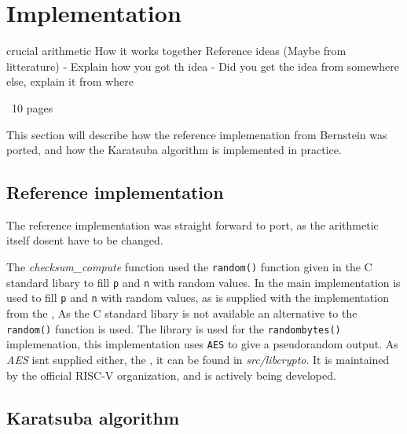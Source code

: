 \section{Implementation}
    crucial arithmetic
    How it works together
    Reference ideas (Maybe from litterature)
    - Explain how you got th idea
    - Did you get the idea from somewhere else, explain it from where

~10 pages

This section will describe how the reference implemenation from Bernstein was ported, and how the Karatsuba algorithm is implemented in practice.
\subsection{Reference implementation}
The reference implementation was straight forward to port, as the arithmetic itself dosent have to be changed.


The \textit{checksum_compute} function used the \texttt{random()} function given in the C standard libary to fill \texttt{p} and \texttt{n} with random values. In the main implementation  is used to fill \texttt{p} and \texttt{n} with random values, as  is supplied with the implementation from the \cite[rainbowgit implemenation]{rainbowgit}, 
As the C standard libary is not available an alternative to the \texttt{random()} function is used. The library \cite[rainbowgit]{rainbowgit} is used for the \texttt{randombytes()} implemenation, this implementation uses \texttt{AES} to give a pseudorandom output. As \textit{AES} isnt supplied either, the \cite[libcrypto library]{libcrypto}, it can be found in \textit{src/libcrypto}. It is maintained by the official RISC-V organization, and is actively being developed.



\subsection{Karatsuba algorithm}